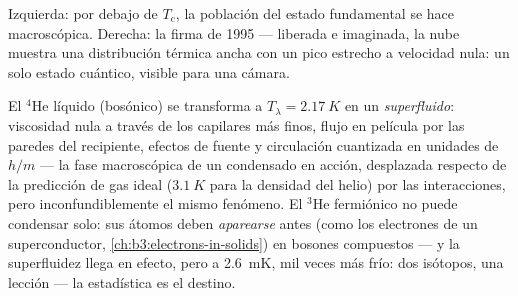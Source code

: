 \begin{omfigure}

{\small Izquierda: por debajo de $T_{\text{c}}$, la población del estado
fundamental se hace macroscópica. Derecha: la firma de 1995 --- liberada e
imaginada, la nube muestra una distribución térmica ancha con un pico
estrecho a velocidad nula: un solo estado cuántico, visible para una cámara.}
\end{omfigure}

\begin{example}\label{ex:b3:quantum-statistics:helium}
El $^4$He líquido (bosónico) se transforma a $T_\lambda = \qty{2.17}{K}$
en un \emph{superfluido}: viscosidad nula a través de los capilares más
finos, flujo en película por las paredes del recipiente, efectos de fuente y
circulación cuantizada en unidades de $h/m$ --- la fase macroscópica de un
condensado en acción, desplazada respecto de la predicción de gas ideal
($\qty{3.1}{K}$ para la densidad del helio) por las interacciones, pero
inconfundiblemente el mismo fenómeno. El $^3$He fermiónico no puede condensar
solo: sus átomos deben \emph{aparearse} antes (como los electrones de un
superconductor, \cref{ch:b3:electrons-in-solids}) en bosones
compuestos --- y la superfluidez llega en efecto, pero a \qty{2.6}{mK}, mil
veces más frío: dos isótopos, una lección --- la estadística es el destino.
\end{example}

